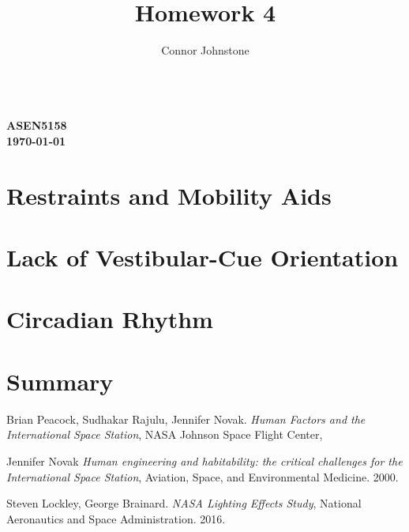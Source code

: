 \documentclass{article}
\renewcommand{\maketitle}{\hspace{-22px}  \textbf{{\theauthor} \\
ASEN5158 \\
\today \\
{\thetitle}} \titlerule}
\begin{document}
  \title{Homework 4}
  \author{Connor Johnstone}

  \maketitle


  \section{Restraints and Mobility Aids}

  \section{Lack of Vestibular-Cue Orientation}

  \section{Circadian Rhythm}

  \section{Summary}

\begin{thebibliography}{9}

    Brian Peacock, Sudhakar Rajulu, Jennifer Novak.
    \textit{Human Factors and the International Space Station},
    NASA Johnson Space Flight Center,

    Jennifer Novak
    \textit{Human engineering and habitability: the critical challenges for the International Space Station},
    Aviation, Space, and Environmental Medicine.
    2000.

    Steven Lockley, George Brainard.
    \textit{NASA Lighting Effects Study},
    National Aeronautics and Space Administration.
    2016.

\end{thebibliography}
\end{document}
